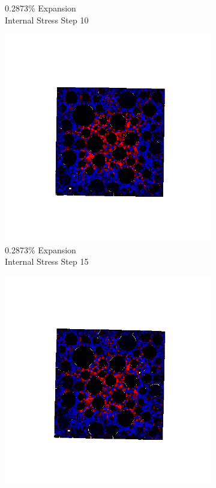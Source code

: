 \begin{figure}[ht!]
\begin{subfigure}{.25\textwidth}
      \caption{0.2873\% Expansion\\Internal Stress Step 10}
    \end{subfigure}%
    \begin{subfigure}{.25\textwidth}
      \centering
      \includegraphics[width=1.0\linewidth]{Files/exp_3D/DEF/A30X0C_2_s15.png}
      \caption{0.2873\% Expansion\\Internal Stress Step 15}
    \end{subfigure}%
    \begin{subfigure}{.25\textwidth}
      \centering
      \includegraphics[width=1.0\linewidth]{Files/exp_3D/DEF/A30X0C_2_stress.png}

\end{subfigure}
\end{figure}
